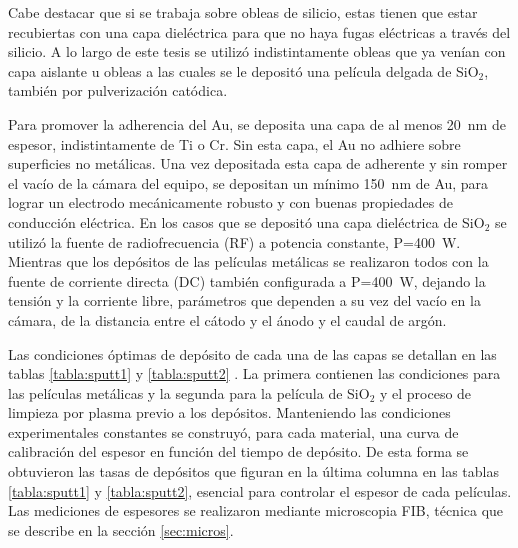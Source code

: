 			Cabe destacar que si se trabaja sobre obleas de silicio, estas tienen que estar recubiertas con una capa dieléctrica para que no haya fugas eléctricas a través del silicio. A lo largo de este tesis se utilizó indistintamente obleas que ya venían con capa aislante u obleas a las cuales se le depositó una película delgada de SiO$_2$, también por pulverización catódica.

			Para promover la adherencia del Au, se deposita una capa de al menos \SI{20}{\nm} de espesor, indistintamente de Ti o Cr. Sin esta capa, el Au no adhiere sobre superficies no metálicas\cite{Hieber1976}. Una vez depositada esta capa de adherente y sin romper el vacío de la cámara del equipo, se depositan un mínimo \SI{150}{\nm} de Au, para lograr un electrodo mecánicamente robusto y con buenas propiedades de conducción eléctrica. En los casos que se depositó una capa dieléctrica de SiO$_2$ se utilizó la fuente de radiofrecuencia (RF) a potencia constante, P=\SI{400}{W}. Mientras que los depósitos de las películas metálicas se realizaron todos con la fuente de corriente directa (DC) también configurada a P=\SI{400}{W}, dejando la tensión y la corriente libre, parámetros que dependen a su vez del vacío en la cámara, de la distancia entre el cátodo y el ánodo y el caudal de argón. 

			
			Las condiciones óptimas de depósito de cada una de las capas se detallan en las tablas \ref{tabla:sputt1} y \ref{tabla:sputt2} . La primera contienen las condiciones para las películas metálicas y la segunda para la película de SiO$_2$ y el proceso de limpieza por plasma previo a los depósitos. Manteniendo las condiciones experimentales constantes se construyó, para cada material, una curva de calibración del espesor en función del tiempo de depósito. De esta forma se obtuvieron las tasas de depósitos que figuran en la última columna en las tablas \ref{tabla:sputt1} y \ref{tabla:sputt2}, esencial para controlar el espesor de cada películas. Las mediciones de espesores se realizaron mediante microscopia FIB, técnica que se describe en la sección \ref{sec:micros}.


